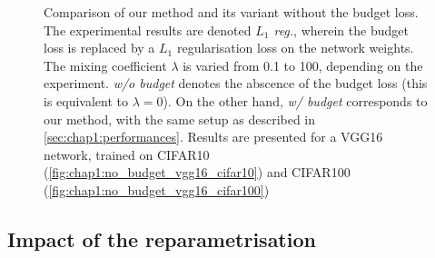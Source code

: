 \begin{figure}
  \centering
    \caption{ Comparison of our method and its variant without the
    budget loss. The experimental results are denoted \emph{$L_1$ reg.}, wherein
    the budget loss is replaced by a $L_1$ regularisation loss on the network
    weights. The mixing coefficient $\lambda$ is varied from 0.1 to 100,
    depending on the experiment. \emph{w/o budget} denotes the abscence of the
    budget loss (this is equivalent to $\lambda = 0$). On the other hand,
    \emph{w/ budget} corresponds to our method, with the same setup as described
    in \cref{sec:chap1:performances}. Results are presented for a VGG16 network,
    trained on CIFAR10 (\cref{fig:chap1:no_budget_vgg16_cifar10}) and CIFAR100
    (\cref{fig:chap1:no_budget_vgg16_cifar100})}       
    \label{fig:chap1:no_budget_vgg16}
\end{figure}



\subsection{Impact of the reparametrisation}
\label{sec:chap1:impact_of_reparametrisation}

